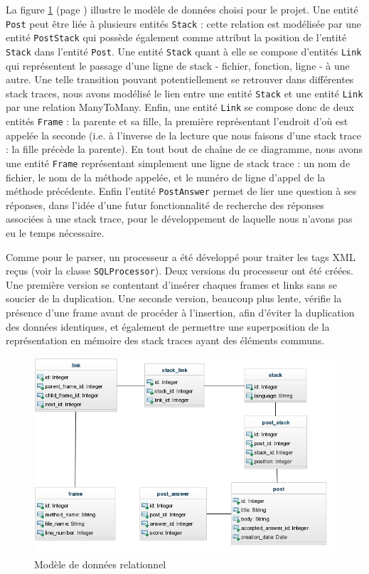 \documentclass[11pt,a4paper]{article}
\begin{document}
La figure \ref{fig:model} (page \pageref{fig:model}) illustre le modèle de données choisi pour le projet.
Une entité \texttt{Post} peut être liée à plusieurs entités \texttt{Stack} : cette relation est modélisée par une entité \texttt{PostStack} qui possède également comme attribut la position de l'entité \texttt{Stack} dans l'entité \texttt{Post}.
Une entité \texttt{Stack} quant à elle se compose d'entités \texttt{Link} qui représentent le passage d'une ligne de stack - fichier, fonction, ligne - à une autre.
Une telle transition pouvant potentiellement se retrouver dans différentes stack traces, nous avons modélisé le lien entre une entité \texttt{Stack} et une entité \texttt{Link} par une relation ManyToMany.
Enfin, une entité \texttt{Link} se compose donc de deux entités \texttt{Frame} : la parente et sa fille, la première représentant l'endroit d'où est appelée la seconde (i.e. à l'inverse de la lecture que nous faisons d'une stack trace : la fille précède la parente).
En tout bout de chaîne de ce diagramme, nous avons une entité \texttt{Frame} représentant simplement une ligne de stack trace : un nom de fichier, le nom de la méthode appelée, et le numéro de ligne d'appel de la méthode précédente.
Enfin l'entité \texttt{PostAnswer} permet de lier une question à ses réponses, dans l'idée d'une futur fonctionnalité de recherche des réponses associées à une stack trace, pour le développement de laquelle nous n'avons pas eu le temps nécessaire.
\newline

Comme pour le parser, un processeur a été développé pour traiter les tags XML reçus (voir la classe \texttt{SQLProcessor}).
Deux versions du processeur ont été créées.
Une première version se contentant d'insérer chaques frames et links sans se soucier de la duplication.
Une seconde version, beaucoup plus lente, vérifie la présence d'une frame avant de procéder à l'insertion, afin d'éviter la duplication des données identiques, et également de permettre une superposition de la représentation en mémoire des stack traces ayant des éléments communs.
\newline

\begin{figure}[h]
  \label{fig:model}
  \includegraphics{stack_mining.jpeg}
  \caption{Modèle de données relationnel}
\end{figure}
\end{document}
